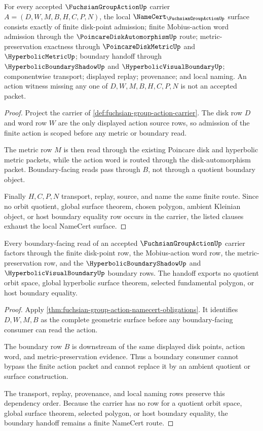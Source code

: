 \begin{theorem}
\label{thm:fuchsian-group-action-namecert-obligations}
For every accepted $\FuchsianGroupActionUp$ carrier $A=(D,W,M,B,H,C,P,N)$, the local $\NameCert_{\FuchsianGroupActionUp}$ surface consists exactly of finite disk-point admission; finite Mobius-action word admission through the $\PoincareDiskAutomorphismUp$ route; metric-preservation exactness through $\PoincareDiskMetricUp$ and $\HyperbolicMetricUp$; boundary handoff through $\HyperbolicBoundaryShadowUp$ and $\HyperbolicVisualBoundaryUp$; componentwise transport; displayed replay; provenance; and local naming. An action witness missing any one of $D,W,M,B,H,C,P,N$ is not an accepted packet.
\end{theorem}
\begin{proof}
Project the carrier of \autoref{def:fuchsian-group-action-carrier}. The disk row $D$ and word row $W$ are the only displayed action source rows, so admission of the finite action is scoped before any metric or boundary read.

The metric row $M$ is then read through the existing Poincare disk and hyperbolic metric packets, while the action word is routed through the disk-automorphism packet. Boundary-facing reads pass through $B$, not through a quotient boundary object.

Finally $H,C,P,N$ transport, replay, source, and name the same finite route. Since no orbit quotient, global surface theorem, chosen polygon, ambient Kleinian object, or host boundary equality row occurs in the carrier, the listed clauses exhaust the local NameCert surface.
\end{proof}

\begin{theorem}
\label{thm:fuchsian-group-action-boundary-handoff}
Every boundary-facing read of an accepted $\FuchsianGroupActionUp$ carrier factors through the finite disk-point row, the Mobius-action word row, the metric-preservation row, and the $\HyperbolicBoundaryShadowUp$ and $\HyperbolicVisualBoundaryUp$ boundary rows. The handoff exports no quotient orbit space, global hyperbolic surface theorem, selected fundamental polygon, or host boundary equality.
\end{theorem}
\begin{proof}
Apply \autoref{thm:fuchsian-group-action-namecert-obligations}. It identifies $D,W,M,B$ as the complete geometric surface before any boundary-facing consumer can read the action.

The boundary row $B$ is downstream of the same displayed disk points, action word, and metric-preservation evidence. Thus a boundary consumer cannot bypass the finite action packet and cannot replace it by an ambient quotient or surface construction.

The transport, replay, provenance, and local naming rows preserve this dependency order. Because the carrier has no row for a quotient orbit space, global surface theorem, selected polygon, or host boundary equality, the boundary handoff remains a finite NameCert route.
\end{proof}

